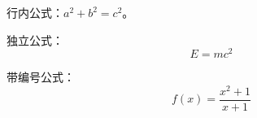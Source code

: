 \documentclass[12pt,a4paper]{ctexart} %
\begin{document}
行内公式：$a^2 + b^2 = c^2$。 %

独立公式： %
\[
E = mc^2
\]

带编号公式： %
\begin{equation}
f(x) = \frac{x^2 + 1}{x + 1} %
\end{equation}
\end{document}
